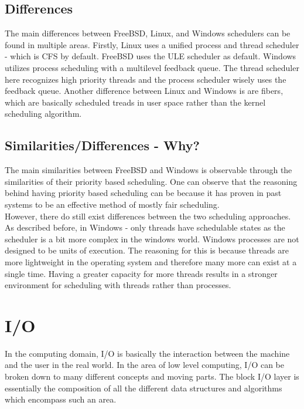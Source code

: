 \documentclass[letterpaper,10pt,titlepage]{article}
\begin{document}
\subsection{Differences}

The main differences between FreeBSD, Linux, and Windows schedulers can be found in multiple areas.  Firstly, Linux uses a unified process and thread scheduler - which is CFS by default.  FreeBSD uses the ULE scheduler as default.  Windows utilizes process scheduling with a multilevel feedback queue.  The thread scheduler here recognizes high priority threads and the process scheduler wisely uses the feedback queue.  Another difference between Linux and Windows is are fibers, which are basically scheduled treads in user space rather than the kernel scheduling algorithm.\\

\subsection{Similarities/Differences - Why?}

The main similarities between FreeBSD and Windows is observable through the similarities of their priority based scheduling.  One can observe that the reasoning behind having priority based scheduling can be because it has proven in past systems to be an effective method of mostly fair scheduling.\\

However, there do still exist differences between the two scheduling approaches.  As described before, in Windows - only threads have schedulable states as the scheduler is a bit more complex in the windows world.  Windows processes are not designed to be units of execution.  The reasoning for this is because threads are more lightweight in the operating system and therefore many more can exist at a single time.  Having a greater capacity for more threads results in a stronger environment for scheduling with threads rather than processes.\\

\section{I/O}

In the computing domain, I/O is basically the interaction between the machine and the user in the real world.  In the area of low level computing, I/O can be broken down to many different concepts and moving parts.  The block I/O layer is essentially the composition of all the different data structures and algorithms which encompass such an area.
\end{document}
